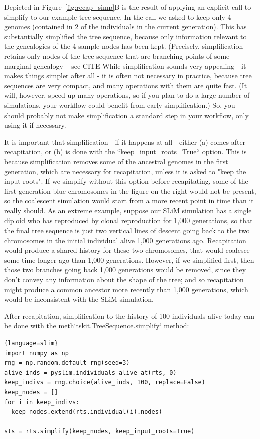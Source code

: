\documentclass[12pt]{article}
\begin{document}
Depicted in Figure~\ref{fig:recap_simp}B is the result of applying an explicit call to
simplify to our example tree sequence.
In the call we asked to keep only 4
genomes (contained in 2 of the individuals in the current generation). This has
substantially simplified the tree sequence, because only information relevant to the
genealogies of the 4 sample nodes has been kept. (Precisely, simplification retains only
nodes of the tree sequence that are branching points of some marginal genealogy -- see
CITE %
While simplification sounds very appealing - it makes things simpler after all -
it is often not necessary in practice, because tree sequences are very compact,
and many operations with them are quite fast.
(It will, however, speed up many operations, so if you plan to do a large number of simulations,
your workflow could benefit from early simplification.)
So, you should probably not make simplification a standard step in your workflow,
only using it if necessary.

It is important that simplification - if it happens at all -
either (a) comes after recapitation, or (b) is done with the
``keep\_input\_roots=True`` option.
This is because simplification removes some of the
ancestral genomes in the first generation,
which are necessary for recapitation,
unless it is asked to "keep the input roots".
If we simplify without this option before recapitating,
some of the first-generation blue chromosomes in the figure on the right
would not be present, so the coalescent simulation would start from a more recent point in time
than it really should.
As an extreme example, suppose our SLiM simulation has a single diploid who has reproduced
by clonal reproduction for 1,000 generations,
so that the final tree sequence is just two vertical lines of descent going back
to the two chromosomes in the initial individual alive 1,000 generations ago.
Recapitation would produce a shared history for these two chromosomes,
that would coalesce some time longer ago than 1,000 generations.
However, if we simplified first, then those two branches going back 1,000 generations would be removed,
since they don't convey any information about the shape of the tree;
and so recapitation might produce a common ancestor more recently than 1,000 generations,
which would be inconsistent with the SLiM simulation.

After recapitation,
simplification to the history of 100 individuals alive today
can be done with the {meth}`tskit.TreeSequence.simplify` method:
\begin{lstlisting}{language=slim}
import numpy as np
rng = np.random.default_rng(seed=3)
alive_inds = pyslim.individuals_alive_at(rts, 0)
keep_indivs = rng.choice(alive_inds, 100, replace=False)
keep_nodes = []
for i in keep_indivs:
  keep_nodes.extend(rts.individual(i).nodes)

sts = rts.simplify(keep_nodes, keep_input_roots=True)
\end{lstlisting}
\end{document}
